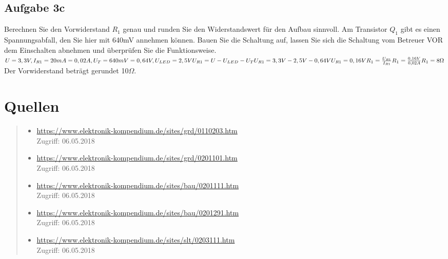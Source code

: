 	\subsection{Aufgabe 3c}
		Berechnen Sie den Vorwiderstand $R_{1}$ genau und runden Sie den Widerstandswert für den Aufbau sinnvoll. Am Transistor $Q_{1}$ gibt es einen Spannungsabfall, den Sie hier mit 640mV annehmen können. Bauen Sie die Schaltung auf, lassen Sie sich die Schaltung vom Betreuer VOR dem Einschalten abnehmen und überprüfen Sie die Funktionsweise.\\
		$
		U = 3,3V, I_{R1} = 20mA = 0,02A, U_{T} = 640mV = 0,64V, U_{LED} = 2,5V\\
		U_{R1} = U - U_{LED} - U_{T}\\
		U_{R1} = 3,3V - 2,5V - 0,64V\\
		U_{R1} = 0,16V\\
		R_{1} = \frac{U_{R1}}{I_{R1}}\\
		R_{1} = \frac{0,16V}{0,02A}\\
		R_{1} = 8\Omega\\
		$
		Der Vorwiderstand beträgt gerundet 10$\Omega$.\\
\section{Quellen}
	\begin{quote}
		\begin{itemize}
			\item \url{https://www.elektronik-kompendium.de/sites/grd/0110203.htm} \\Zugriff: 06.05.2018\\
			\item \url{https://www.elektronik-kompendium.de/sites/grd/0201101.htm} \\Zugriff: 06.05.2018\\
			\item \url{https://www.elektronik-kompendium.de/sites/bau/0201111.htm} \\Zugriff: 06.05.2018\\
			\item \url{https://www.elektronik-kompendium.de/sites/bau/0201291.htm} \\Zugriff: 06.05.2018\\
			\item \url{https://www.elektronik-kompendium.de/sites/slt/0203111.htm} \\Zugriff: 06.05.2018\\
		\end{itemize}
	\end{quote}
